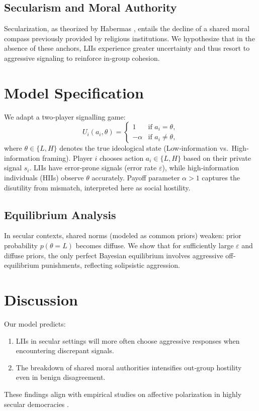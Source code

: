 \documentclass[11pt]{article}
\begin{document}
\subsection{Secularism and Moral Authority}
Secularization, as theorized by Habermas \cite{habermas_deliberative}, entails the decline of a shared moral compass previously provided by religious institutions. We hypothesize that in the absence of these anchors, LIIs experience greater uncertainty and thus resort to aggressive signaling to reinforce in‐group cohesion.

\section{Model Specification}
We adapt a two‐player signalling game:
\[
U_i(a_i, \theta) = 
\begin{cases}
1 & \text{if } a_i = \theta,\\
-\alpha & \text{if } a_i \neq \theta,
\end{cases}
\]
where $\theta \in \{L,H\}$ denotes the true ideological state (Low‐information vs.\ High‐information framing). Player $i$ chooses action $a_i \in \{L,H\}$ based on their private signal $s_i$. LIIs have error‐prone signals (error rate $\varepsilon$), while high‐information individuals (HIIs) observe $\theta$ accurately. Payoff parameter $\alpha>1$ captures the disutility from mismatch, interpreted here as social hostility.

\subsection{Equilibrium Analysis}
In secular contexts, shared norms (modeled as common priors) weaken: prior probability $p(\theta=L)$ becomes diffuse. We show that for sufficiently large $\varepsilon$ and diffuse priors, the only perfect Bayesian equilibrium involves aggressive off‐equilibrium punishments, reflecting solipsistic aggression.

\section{Discussion}
Our model predicts:
\begin{enumerate}
  \item LIIs in secular settings will more often choose aggressive responses when encountering discrepant signals.
  \item The breakdown of shared moral authorities intensifies out‐group hostility even in benign disagreement.
\end{enumerate}
These findings align with empirical studies on affective polarization in highly secular democracies \cite{lewis_secular_polarization}.
\end{document}

